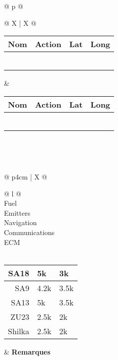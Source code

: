 {\begin{tabularx}{\textwidth}{ @{} p{\linewidth} @{} }
	\\[-3ex] \midrule
	{\begin{tabularx}{\textwidth}{@{} X | X @{}}
		{\begin{tabularx}{\linewidth}{@{} *{4}X @{}}
			Nom & Action & Lat & Long\\[-3ex] \midrule
			\hfill & \hfill & \hfill & \hfill\\ \midrule
			\hfill & \hfill & \hfill & \hfill\\ \midrule
			\hfill & \hfill & \hfill & \hfill\\ \midrule
			\hfill & \hfill & \hfill & \hfill\\ \midrule
			\hfill & \hfill & \hfill & \hfill\\ \midrule
			\hfill & \hfill & \hfill & \hfill\\
		\end{tabularx}} &
		{\begin{tabularx}{\linewidth}{@{} *{4}X @{}}
			Nom & Action & Lat & Long\\[-3ex] \midrule
			\hfill & \hfill & \hfill & \hfill\\ \midrule
			\hfill & \hfill & \hfill & \hfill\\ \midrule
			\hfill & \hfill & \hfill & \hfill\\ \midrule
			\hfill & \hfill & \hfill & \hfill\\ \midrule
			\hfill & \hfill & \hfill & \hfill\\ \midrule
			\hfill & \hfill & \hfill & \hfill\\
		\end{tabularx}}\\
	\end{tabularx}}\\ \midrule
	{\begin{tabularx}{\textwidth}{@{} p{4cm} | X @{}}
		\begin{tabular}[t]{@{} l @{}}
			\\[-3ex] \midrule
			Fuel\\[-3ex]
			Emitters\\[-3ex]
			Navigation\\[-3ex]
			Communications\\[-3ex]
			ECM\\[-3ex]
			\midrule
			\\[-3ex] \midrule
			{\begin{tabularx}{\linewidth}{@{} r X X @{}}
				SA18 & 5k & 3k\\[-3ex] \midrule
				SA9 & 4.2k & 3.5k\\[-3ex] \midrule
				SA13 & 5k & 3.5k\\[-3ex] \midrule
				ZU23 & 2.5k & 2k\\[-3ex] \midrule
				Shilka & 2.5k & 2k\\[-3ex] \midrule
			\end{tabularx}}
		\end{tabular} &
		\textbf{Remarques}\\
	\end{tabularx}}\\
\end{tabularx}
}


